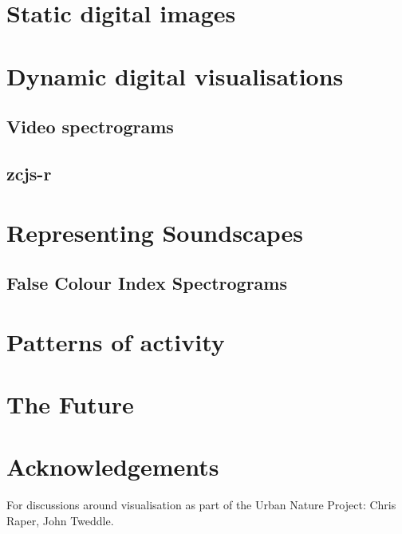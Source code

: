 \documentclass[
]{book}
\begin{document}
\hypertarget{static-digital-images}{%
\chapter{Static digital images}\label{static-digital-images}}

\hypertarget{dynamic-digital-visualisations}{%
\chapter{Dynamic digital visualisations}\label{dynamic-digital-visualisations}}

\hypertarget{video-spectrograms}{%
\section{Video spectrograms}\label{video-spectrograms}}

\hypertarget{zcjs-r}{%
\section{zcjs-r}\label{zcjs-r}}

\hypertarget{representing-soundscapes}{%
\chapter{Representing Soundscapes}\label{representing-soundscapes}}

\hypertarget{false-colour-index-spectrograms}{%
\section{False Colour Index Spectrograms}\label{false-colour-index-spectrograms}}

\hypertarget{patterns-of-activity}{%
\chapter{Patterns of activity}\label{patterns-of-activity}}

\hypertarget{the-future}{%
\chapter{The Future}\label{the-future}}

\hypertarget{acknowledgements}{%
\chapter{Acknowledgements}\label{acknowledgements}}

For discussions around visualisation as part of the Urban Nature Project: Chris Raper, John Tweddle.

  
\end{document}
